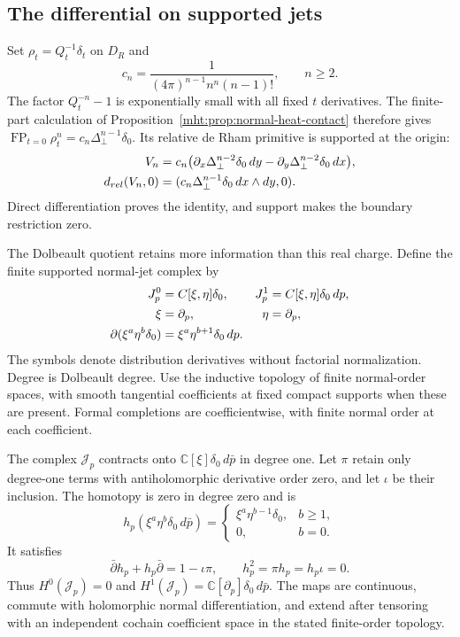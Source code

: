 \subsection{The differential on supported jets}

Set $\rho_t=Q_t^{-1}\delta_t$ on $D_R$ and
\[
 c_n=\frac1{(4\pi)^{n-1}n^n(n-1)!},\qquad n\geq2.
\]
The factor $Q_t^{-n}-1$ is exponentially small with all fixed
$t$ derivatives. The finite-part calculation of
Proposition~\ref{mht:prop:normal-heat-contact} therefore gives
$\operatorname{FP}_{t=0}\rho_t^n=c_n\Delta_\perp^{n-1}\delta_0$.
Its relative de Rham primitive is supported at the origin:
\begin{align}
 V_n&=c_n\bigl(
     \partial_x\Delta_\perp^{n-2}\delta_0\,dy
    -\partial_y\Delta_\perp^{n-2}\delta_0\,dx\bigr),\notag\\
 d_{\mathrm{rel}}(V_n,0)
   &=(c_n\Delta_\perp^{n-1}\delta_0\,dx\wedge dy,0).
       \label{mht:eq:real-contact-primitive}
\end{align}
Direct differentiation proves the identity, and support makes the
boundary restriction zero.

The Dolbeault quotient retains more information than this real charge.
Define the finite supported normal-jet complex by
\begin{align}
 \mathcal J_p^0&=\mathbb C[\xi,\eta]\delta_0,&
 \mathcal J_p^1&=\mathbb C[\xi,\eta]\delta_0\,d\bar p,\notag\\
 \xi&=\partial_p,&\eta&=\partial_{\bar p},\notag\\
 \bar\partial(\xi^a\eta^b\delta_0)
   &=\xi^a\eta^{b+1}\delta_0\,d\bar p.
       \label{mht:eq:supported-normal-jets}
\end{align}
The symbols denote distribution derivatives without factorial
normalization. Degree is Dolbeault degree. Use the inductive topology
of finite normal-order spaces, with smooth tangential coefficients at
fixed compact supports when these are present. Formal completions are
coefficientwise, with finite normal order at each coefficient.

\begin{theorem}\label{mht:thm:supported-normal-contraction}
The complex $\mathcal J_p$ contracts onto
$\mathbb C[\xi]\delta_0\,d\bar p$ in degree one. Let $\pi$ retain
only degree-one terms with antiholomorphic derivative order zero,
and let $\iota$ be their inclusion. The homotopy is zero in degree
zero and is
\[
 h_p(\xi^a\eta^b\delta_0\,d\bar p)=
 \begin{cases}
  \xi^a\eta^{b-1}\delta_0,&b\geq1,\\
  0,&b=0.
 \end{cases}
\]
It satisfies
\[
 \bar\partial h_p+h_p\bar\partial=1-\iota\pi,
 \qquad h_p^2=\pi h_p=h_p\iota=0.
\]
Thus $H^0(\mathcal J_p)=0$ and
$H^1(\mathcal J_p)=\mathbb C[\partial_p]\delta_0\,d\bar p$.
The maps are continuous, commute with holomorphic normal
differentiation, and extend after tensoring with an independent
cochain coefficient space in the stated finite-order topology.
\end{theorem}

